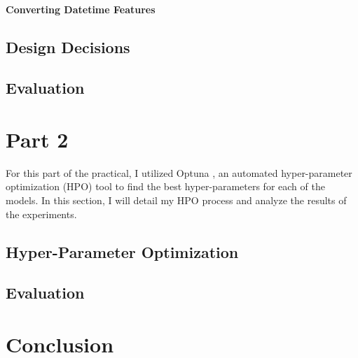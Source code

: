 \documentclass{article}
\begin{document}
\paragraph{Converting Datetime Features}

\subsection{Design Decisions}

\subsection{Evaluation}

\section{Part 2}
For this part of the practical, I utilized Optuna \cite{optuna_2019}, an automated hyper-parameter optimization (HPO) tool to find the best hyper-parameters for each of the models. In this section, I will detail my HPO process and analyze the results of the experiments.

\subsection{Hyper-Parameter Optimization}

\subsection{Evaluation}

\section{Conclusion}

\pagebreak

\printbibliography
\end{document}
